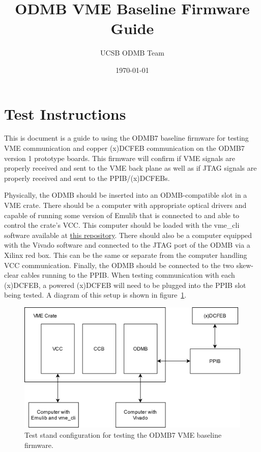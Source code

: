 \documentclass[10pt,a4paper]{article}
\begin{document}
\title{ODMB VME Baseline Firmware Guide}
\author{UCSB ODMB Team}
\date{\today}
\maketitle

\section{Test Instructions}

This is document is a guide to using the ODMB7 baseline firmware for testing VME communication and copper (x)DCFEB communication on the ODMB7 version 1 prototype boards. This firmware will confirm if VME signals are properly received and sent to the VME back plane as well as if JTAG signals are properly received and sent to the PPIB/(x)DCFEBs.

Physically, the ODMB should be inserted into an ODMB-compatible slot in a VME crate. There should be a computer with appropriate optical drivers and capable of running some version of Emulib that is connected to and able to control the crate's VCC. This computer should be loaded with the vme\_cli software available at \href{https://github.com/jaebak/vme_cli}{this repository}. There should also be a computer equipped with the Vivado software and connected to the JTAG port of the ODMB via a Xilinx red box. This can be the same or separate from the computer handling VCC communication. Finally, the ODMB should be connected to the two skew-clear cables running to the PPIB. When testing communication with each (x)DCFEB, a powered (x)DCFEB will need to be plugged into the PPIB slot being tested. A diagram of this setup is shown in figure~\ref{fig:vmesetup}.

\begin{figure}[H]
\centering
\includegraphics[width= 0.5 \textwidth]{figures/vmesetup.png}
\caption{Test stand configuration for testing the ODMB7 VME baseline firmware.}
\label{fig:vmesetup}
\end{figure}
\end{document}
